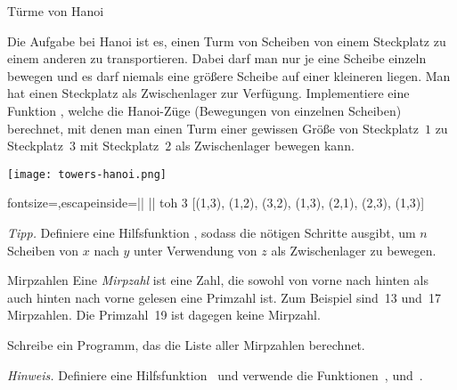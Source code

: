 \documentclass{uebblatt}
\begin{document}
\begin{aufgabe}{Türme von Hanoi}
  \begin{minipage}[m]{0.67 \linewidth}
    Die Aufgabe bei Hanoi ist es, einen Turm von Scheiben von einem Steckplatz zu einem anderen zu transportieren. Dabei darf man nur je eine Scheibe einzeln bewegen und es darf niemals eine größere Scheibe auf einer kleineren liegen. Man hat einen Steckplatz als Zwischenlager zur Verfügung.
    Implementiere eine Funktion , welche die Hanoi-Züge (Bewegungen von einzelnen Scheiben) berechnet, mit denen man einen Turm einer gewissen Größe von Steckplatz~$1$ zu Steckplatz~$3$ mit Steckplatz~$2$ als Zwischenlager bewegen kann.
  \end{minipage}
  \begin{minipage}{0.32 \linewidth}
    \hfill \texttt{[image: towers-hanoi.png]}
  \end{minipage}
  
  \begin{haskellcode*}{fontsize=\small,escapeinside=||}
|\ghci| toh 3
[(1,3), (1,2), (3,2), (1,3), (2,1), (2,3), (1,3)]
  \end{haskellcode*}
  
  {\scriptsize \emph{Tipp.} Definiere eine Hilfsfunktion , sodass  die nötigen Schritte ausgibt, um $n$ Scheiben von $x$ nach $y$ unter Verwendung von $z$ als Zwischenlager zu bewegen.\par}
\end{aufgabe}

\begin{aufgabe}{Mirpzahlen}
Eine \emph{Mirpzahl} ist eine Zahl, die sowohl von vorne nach hinten als auch
hinten nach vorne gelesen eine Primzahl ist. Zum Beispiel sind~13 und~17
Mirpzahlen. Die Primzahl~19 ist dagegen keine Mirpzahl.

Schreibe ein Programm, das die Liste aller Mirpzahlen berechnet.

{\scriptsize\emph{Hinweis.} Definiere eine Hilfsfunktion~ und verwende die Funktionen~,  und~.\par}
\end{aufgabe}
\end{document}
